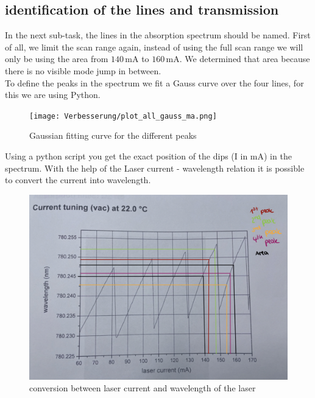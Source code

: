 \subsection{identification of the lines and transmission}
In the next sub-task, the lines in the absorption spectrum should be named.
First of all, we limit the scan range again, instead of using the full scan range we will only 
be using the area from $140\,$mA to $160\,$mA. We determined that area because there is 
no visible mode jump in between. \\
To define the peaks in the spectrum we fit a Gauss curve over the four lines, for this
we are using Python.
\begin{center}
    \begin{figure}[h]
        \centering
        \texttt{[image: Verbesserung/plot\_all\_gauss\_ma.png]}
        \caption{Gaussian fitting curve for the different peaks}
        \label{fig:gauss}
    \end{figure}
\end{center}
Using a python script you get the exact position of the dips (I in mA) in the spectrum. 
With the help of the Laser current - wavelength relation 
it is possible to convert the current into wavelength. 
\newpage
\begin{center}
    \begin{figure}[h]
        \centering
        \includegraphics[scale=0.3]{Bilder/Auswertung_Anna/laser-wavelength.jpg}
        \caption{conversion between laser current and wavelength of the laser}
        \label{fig:currentwave}
    \end{figure}
\end{center}

